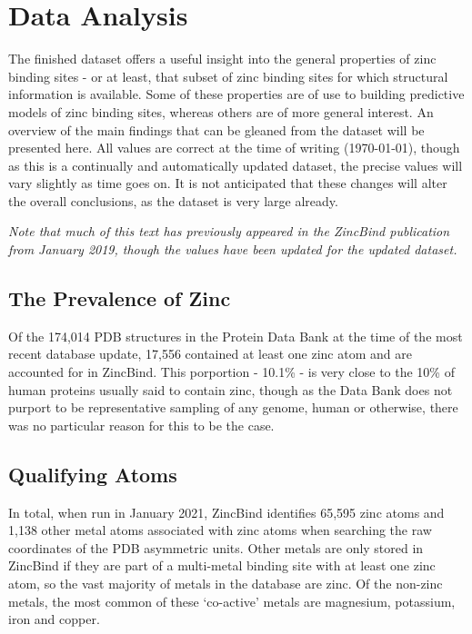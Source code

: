 \section{Data Analysis}

The finished dataset offers a useful insight into the general properties of zinc binding sites - or at least, that subset of zinc binding sites for which structural information is available. Some of these properties are of use to building predictive models of zinc binding sites, whereas others are of more general interest. An overview of the main findings that can be gleaned from the dataset will be presented here. All values are correct at the time of writing ({\today}), though as this is a continually and automatically updated dataset, the precise values will vary slightly as time goes on. It is not anticipated that these changes will alter the overall conclusions, as the dataset is very large already.

\emph{Note that much of this text has previously appeared in the ZincBind publication from January 2019, though the values have been updated for the updated dataset.}

\subsection{The Prevalence of Zinc}

Of the 174,014 PDB structures in the Protein Data Bank at the time of the most recent database update, 17,556 contained at least one zinc atom and are accounted for in ZincBind. This porportion - 10.1\% - is very close to the 10\% of human proteins usually said to contain zinc, though as the Data Bank does not purport to be representative sampling of any genome, human or otherwise, there was no particular reason for this to be the case.

\subsection{Qualifying Atoms}

In total, when run in January 2021, ZincBind identifies 65,595 zinc atoms and 1,138 other metal atoms associated with zinc atoms when searching the raw coordinates of the PDB asymmetric units. Other metals are only stored in ZincBind if they are part of a multi-metal binding site with at least one zinc atom, so the vast majority of metals in the database are zinc. Of the non-zinc metals, the most common of these `co-active' metals are magnesium, potassium, iron and copper.

